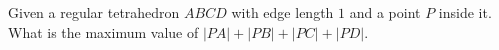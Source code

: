 Given a regular  tetrahedron   $ABCD$   with edge length $1$ and a point $P$ inside it.
What is the maximum value of   $\left|PA\right|+\left|PB\right|+\left|PC\right|+\left|PD\right|$.